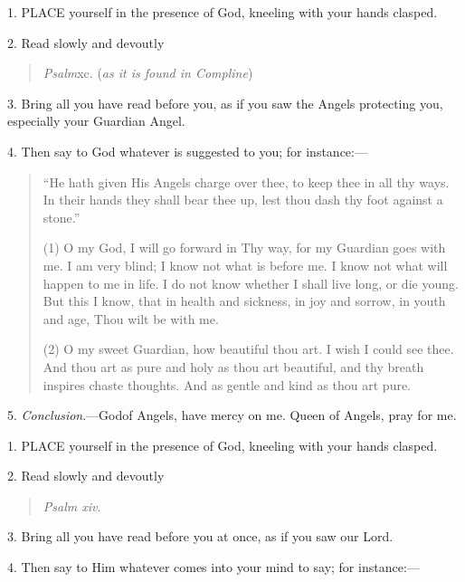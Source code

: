 1. PLACE
yourself in the presence of God, kneeling with your hands clasped.

2. Read slowly and devoutly

\begin{quote}

\emph{Psalm}xc.
(\emph{as it is found in Compline})

\end{quote}

3. Bring all you have read
before you, as if you saw the Angels protecting you, especially your
Guardian Angel.

4. Then say to God whatever is
suggested to you; for instance:—

\begin{quote}

``He
hath given His Angels charge over thee, to keep thee in all thy ways.
In their hands they shall bear thee up, lest thou dash thy foot
against a stone.''

(1) O my God, I will go
forward in Thy way, for my Guardian goes with me. I am very blind; I
know not what is before me. I know not what will happen to me in life.
I do not know whether I shall live long, or die young. But this I
know, that in health and sickness, in joy and sorrow, in youth and
age, Thou wilt be with me.

(2) O my sweet Guardian, how
beautiful thou art. I wish I could see thee. And thou art as
pure and holy as thou art beautiful, and thy breath inspires chaste
thoughts. And as gentle and kind as thou art pure.

\end{quote}

5. \emph{Conclusion}.—God\emph{}of
Angels, have mercy on me. Queen of Angels, pray for me.


1. PLACE
yourself in the presence of God, kneeling with your hands clasped.

2. Read slowly and devoutly

\begin{quote}

\emph{Psalm xiv}.

\end{quote}

3. Bring all you have read
before you at once, as if you saw our Lord.

4. Then say to Him whatever
comes into your mind to say; for instance:—

